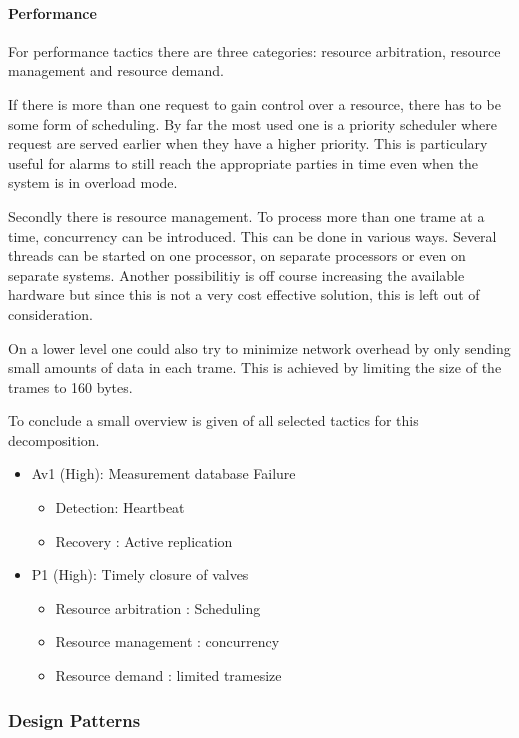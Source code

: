 \paragraph{Performance} 

\npar For performance tactics there are three categories: resource
arbitration, resource management and resource demand.

\npar If there is more than one request to gain control over a resource, there
has to be some form of scheduling. By far the most used one is a priority
scheduler where request are served earlier when they have a higher priority.
This is particulary useful for alarms to still reach the appropriate parties in
time even when the system is in overload mode. 

\npar Secondly there is resource management. To process more than one trame at a
time, concurrency can be introduced. This can be done in various ways. Several
threads can be started on one processor, on separate processors or even on
separate systems. Another possibilitiy is off course increasing the available
hardware but since this is not a very cost effective solution, this is left out
of consideration.

\npar On a lower level one could also try to minimize network overhead by
only sending small amounts of data in each trame. This is achieved by
limiting the size of the trames to 160 bytes.

\npar To conclude a small overview is given of all selected tactics for this
decomposition.

\begin{itemize}
 	\item Av1 (High): Measurement database Failure
 	\begin{itemize}
 		\item Detection: Heartbeat 
 		\item Recovery : Active replication
 	\end{itemize}
  	\item P1 (High): Timely closure of valves
  	\begin{itemize}
  		\item Resource arbitration : Scheduling
		\item Resource management  : concurrency
		\item Resource demand      : limited tramesize
  	\end{itemize}
\end{itemize}

\subsubsection{Design Patterns}
\label{add:it1/patterns} %

